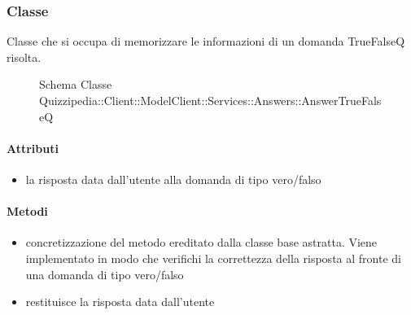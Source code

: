 \subsubsection{Classe }
Classe che si occupa di memorizzare le informazioni di un domanda TrueFalseQ risolta.
\begin{figure}[H]
\centering
\noindent{}
\caption[Schema Classe AnswerTrueFalseQ]{Schema Classe Quizzipedia::Client::ModelClient::Services::Answers::AnswerTrueFalseQ}
\end{figure}
\paragraph{Attributi}
\begin{itemize}
\item {}
\newline
la risposta data dall'utente alla domanda di tipo vero/falso
\end{itemize}
\paragraph{Metodi}
\begin{itemize}
\item {}
\newline
concretizzazione del metodo ereditato dalla classe base astratta. Viene implementato in modo che verifichi la correttezza della risposta al fronte di una domanda di tipo vero/falso
\newline
\item {}
\newline
restituisce la risposta data dall'utente
\newline
\end{itemize}
